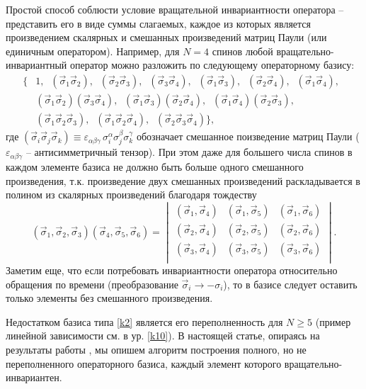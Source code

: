 \documentclass[]{article}
\renewcommand{\[}{\begin{equation}}
\renewcommand{\]}{\end{equation}}
\begin{document}
Простой способ соблюсти условие вращательной инвариантности оператора -- представить его в виде суммы слагаемых, каждое из которых является произведением скалярных и смешанных произведений матриц Паули (или единичным оператором). Например, для $N=4$ спинов любой вращательно-инвариантный оператор можно разложить по следующему операторному базису:
\begin{align}
\{ & 1,  \;\;
({\vec \sigma}_1{\vec\sigma}_2), \;\; 
({\vec \sigma}_2{\vec\sigma}_3), \;\;
({\vec \sigma}_3{\vec\sigma}_4), \;\;
({\vec \sigma}_1{\vec\sigma}_3), \;\;
({\vec \sigma}_2{\vec\sigma}_4), \;\;
({\vec \sigma}_1{\vec\sigma}_4), \;\;
\nonumber\\
&({\vec \sigma}_1{\vec\sigma}_2)({\vec \sigma}_3{\vec\sigma}_4),\;\;({\vec \sigma}_1{\vec\sigma}_3)({\vec \sigma}_2{\vec\sigma}_4),\;\;
({\vec \sigma}_1{\vec\sigma}_4)({\vec \sigma}_2{\vec\sigma}_3),\;\; \nonumber \\
&({\vec \sigma}_1{\vec\sigma}_2{\vec\sigma}_3),\;\;({\vec \sigma}_1{\vec\sigma}_2{\vec\sigma}_4),\;\;({\vec \sigma}_2{\vec\sigma}_3{\vec\sigma}_4)
\},
\label{k2}
\end{align}
где $({\vec \sigma}_i{\vec\sigma}_j{\vec\sigma}_k)\equiv \varepsilon_{\alpha \beta \gamma} \, \sigma_i^\alpha \sigma_j^\beta \sigma_k^\gamma$ обозначает смешанное поизведение матриц Паули ($ \varepsilon_{\alpha \beta \gamma}$  -- антисимметричный тензор).
При этом даже для большего числа спинов в каждом элементе базиса не должно быть больше одного смешанного произведения, т.к. произведение двух смешанных произведений раскладывается в полином из скалярных произведений благодаря тождеству
\[
(\vec\sigma_1,\vec\sigma_2,\vec\sigma_3)
(\vec\sigma_4,\vec\sigma_5,\vec\sigma_6)=
\begin{vmatrix}
	(\vec\sigma_1,\vec\sigma_4) & 	(\vec\sigma_1,\vec\sigma_5) & (\vec\sigma_1,\vec\sigma_6) \\
	(\vec\sigma_2,\vec\sigma_4) & 	(\vec\sigma_2,\vec\sigma_5) & (\vec\sigma_2,\vec\sigma_6) \\
	(\vec\sigma_3,\vec\sigma_4) & 	(\vec\sigma_3,\vec\sigma_5) & (\vec\sigma_3,\vec\sigma_6) \\
\end{vmatrix}.
\label{k3}
\]
Заметим еще, что если потребовать инвариантности оператора относительно обращения по времени (преобразование $\vec\sigma_i\rightarrow -\sigma_i$), то в базисе следует оставить только элементы без смешанного произведения.


Недостатком базиса типа \eqref{k2} является его переполненность для $N\geq 5$ \cite{variational}(пример линейной зависимости см. в ур. \eqref{k10}).
В настоящей статье, опираясь на результаты работы \cite{sourceArticle}, мы опишем алгоритм построения полного, но не переполненного операторного базиса, каждый элемент которого вращательно-инвариантен.
\end{document}
